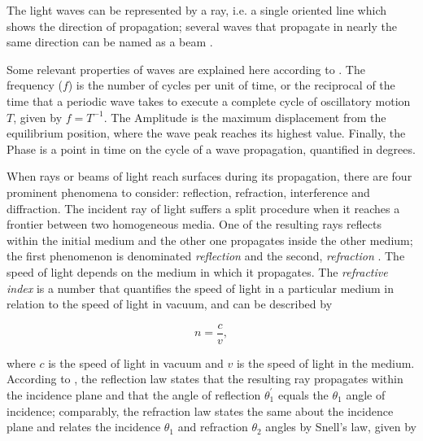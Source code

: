 The light waves can be represented by a ray, i.e. a single oriented line which shows the direction of propagation; several waves that propagate in nearly the same direction can be named as a beam \cite{halliday2013fundamentals}. 


Some relevant properties of waves are explained here according to . The frequency ($f$) is the number of cycles per unit of time, or the reciprocal of the time that a periodic wave takes to execute a complete cycle of oscillatory motion $T$, given by $f = T^{-1}$. The Amplitude is the maximum displacement from the equilibrium position, where the wave peak reaches its highest value. Finally, the Phase is a point in time on the cycle of a wave propagation, quantified in degrees.

When rays or beams of light reach surfaces during its propagation, there are four prominent phenomena to consider: reflection, refraction, interference and diffraction. The incident ray of light suffers a split procedure when it reaches a frontier between two homogeneous media. One of the resulting rays reflects within the initial medium and the other one propagates inside the other medium; the first phenomenon is denominated \emph{reflection} and the second, \emph{refraction} \cite{born1999principles}. The speed of light depends on the medium in which it propagates. The \emph{refractive index} is a number that quantifies the speed of light in a particular medium in relation to the speed of light in vacuum, and can be described by

\begin{equation}
    \label{eqn:refractive_index}
       n = \frac{c}{v},
\end{equation}

\noindent where $\mathit{c}$ is the speed of light in vacuum and $\mathit{v}$ is the speed of light in the medium. According to , the reflection law states that the resulting ray propagates within the incidence plane and that the angle of reflection $\mathit{\theta^{'}_{1}}$ equals the $\mathit{\theta_{1}}$ angle of incidence; comparably, the refraction law states the same about the incidence plane and relates the incidence $\mathit{\theta_{1}}$ and refraction $\mathit{\theta_{2}}$ angles by Snell's law, given by

